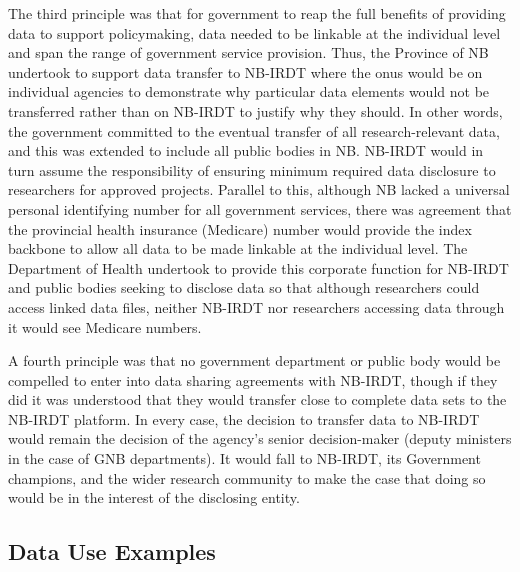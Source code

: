 \documentclass[
]{book}
\begin{document}
The third principle was that for government to reap the full benefits of providing data to support policymaking, data needed to be linkable at the individual level and span the range of government service provision. Thus, the Province of NB undertook to support data transfer to NB-IRDT where the onus would be on individual agencies to demonstrate why particular data elements would not be transferred rather than on NB-IRDT to justify why they should. In other words, the government committed to the eventual transfer of all research-relevant data, and this was extended to include all public bodies in NB. NB-IRDT would in turn assume the responsibility of ensuring minimum required data disclosure to researchers for approved projects. Parallel to this, although NB lacked a universal personal identifying number for all government services, there was agreement that the provincial health insurance (Medicare) number would provide the index backbone to allow all data to be made linkable at the individual level. The Department of Health undertook to provide this corporate function for NB-IRDT and public bodies seeking to disclose data so that although researchers could access linked data files, neither NB-IRDT nor researchers accessing data through it would see Medicare numbers.

A fourth principle was that no government department or public body would be compelled to enter into data sharing agreements with NB-IRDT, though if they did it was understood that they would transfer close to complete data sets to the NB-IRDT platform. In every case, the decision to transfer data to NB-IRDT would remain the decision of the agency's senior decision-maker (deputy ministers in the case of GNB departments). It would fall to NB-IRDT, its Government champions, and the wider research community to make the case that doing so would be in the interest of the disclosing entity.

\hypertarget{data-use-examples-2}{%
\subsection{Data Use Examples}\label{data-use-examples-2}}
\end{document}
